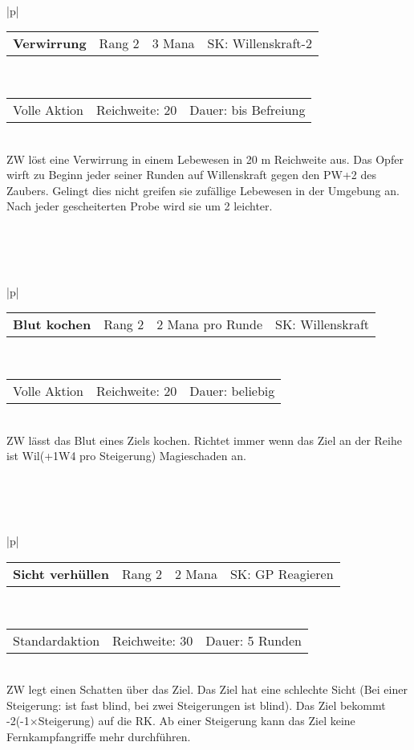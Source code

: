 \documentclass[../../Heldenanleitung2]{subfiles}
\begin{document}
\\\\\\
\begin{tabular}{|p{\textwidth}|}
\hline
\begin{tabularx}{\textwidth}{X|X|X|X}
\textbf{Verwirrung} & Rang 2 & 3 Mana & SK: Willenskraft-2
\end{tabularx} \\ \hline
\begin{tabularx}{\textwidth}{X|X|X}
Volle Aktion & Reichweite: 20 & Dauer: bis Befreiung
\end{tabularx} \\ \hline
ZW löst eine Verwirrung in einem Lebewesen in 20 m Reichweite aus. Das Opfer wirft zu Beginn jeder seiner Runden auf Willenskraft gegen den PW+2 des Zaubers. Gelingt dies nicht greifen sie zufällige Lebewesen in der Umgebung an. Nach jeder gescheiterten Probe wird sie um 2 leichter.
\\ \hline
\end{tabular}
\\\\\\
\begin{tabular}{|p{\textwidth}|}
\hline
\begin{tabularx}{\textwidth}{X|X|X|X}
\textbf{Blut kochen} & Rang 2 & 2 Mana pro Runde & SK: Willenskraft
\end{tabularx} \\ \hline
\begin{tabularx}{\textwidth}{X|X|X}
Volle Aktion & Reichweite: 20 & Dauer: beliebig
\end{tabularx} \\ \hline
ZW lässt das Blut eines Ziels kochen. Richtet immer wenn das Ziel an der Reihe ist Wil(+1W4 pro Steigerung) Magieschaden an.
\\ \hline
\end{tabular}
\\\\\\
\begin{tabular}{|p{\textwidth}|}
\hline
\begin{tabularx}{\textwidth}{X|X|X|X}
\textbf{Sicht verhüllen} & Rang 2 & 2 Mana & SK: GP Reagieren
\end{tabularx} \\ \hline
\begin{tabularx}{\textwidth}{X|X|X}
Standardaktion & Reichweite: 30 & Dauer: 5 Runden
\end{tabularx} \\ \hline
ZW legt einen Schatten über das Ziel. Das Ziel hat eine schlechte Sicht (Bei einer Steigerung: ist fast blind, bei zwei Steigerungen ist blind). Das Ziel bekommt -2(-1$\times$Steigerung) auf die RK. Ab einer Steigerung kann das Ziel keine Fernkampfangriffe mehr durchführen.
\\ \hline
\end{tabular}
\end{document}
